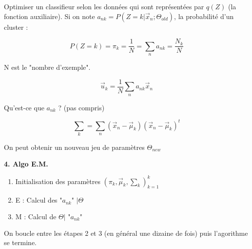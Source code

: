 \documentclass{article}
\begin{document}
Optimiser un classifieur selon les données qui sont représentées par $q(Z)$ (la fonction auxiliaire). Si on note $a_{nk} = P(Z = k | \vec{x}_n; \Theta_{old})$,
la probabilité d'un cluster :

\[ P(Z = k) = \pi_k = \frac{1}{N} = \sum_n a_{nk} = \frac{N_k}{N} \] 

N est le "nombre d'exemple".

\[ \vec{u}_k = \frac{1}{N} \sum_n a_{nk} \vec{x}_n \]

Qu'est-ce que $a_{nk}$ ? (pas compris)

\[ \sum_k = \sum_n (\vec{x}_n - \vec{\mu}_k) (\vec{x}_n - \vec{\mu}_k) ^{t}  \]

On peut obtenir un nouveau jeu de paramètres $\Theta_{new}$

\textbf{4. Algo E.M.}

\begin{enumerate}
\item Initialisation des paramètres $(\pi_k, \vec{\mu}_k, \sum_k)_{k = 1}^{k}$
\item E : Calcul des "$a_{nk}$" $ | \Theta$
\item M : Calcul de $\Theta | $ "$a_{nk}$"
\end{enumerate}

On boucle entre les étapes 2 et 3 (en général une dizaine de fois) puis l'agorithme se termine.
\end{document}
